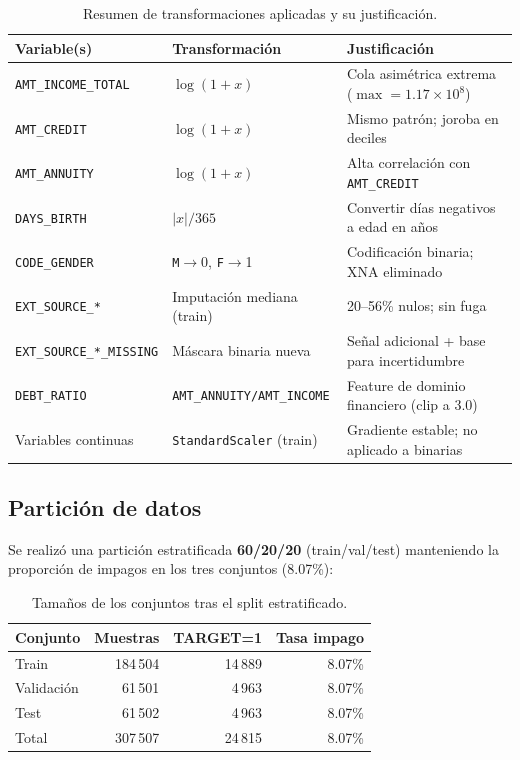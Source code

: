 \documentclass[12pt,a4paper]{article}
\begin{document}
\begin{table}[H]
\centering
\caption{Resumen de transformaciones aplicadas y su justificación.}
\label{tab:transforms}
\small
\begin{tabular}{@{}lll@{}}
\toprule
\textbf{Variable(s)} & \textbf{Transformación} & \textbf{Justificación} \\
\midrule
\texttt{AMT\_INCOME\_TOTAL} & $\log(1+x)$ & Cola asimétrica extrema ($\max = 1.17\times10^8$) \\
\texttt{AMT\_CREDIT} & $\log(1+x)$ & Mismo patrón; joroba en deciles \\
\texttt{AMT\_ANNUITY} & $\log(1+x)$ & Alta correlación con \texttt{AMT\_CREDIT} \\
\texttt{DAYS\_BIRTH} & $|x|/365$ & Convertir días negativos a edad en años \\
\texttt{CODE\_GENDER} & \texttt{M}$\to$0, \texttt{F}$\to$1 & Codificación binaria; XNA eliminado \\
\texttt{EXT\_SOURCE\_*} & Imputación mediana (train) & 20--56\% nulos; sin fuga \\
\texttt{EXT\_SOURCE\_*\_MISSING} & Máscara binaria nueva & Señal adicional + base para incertidumbre \\
\texttt{DEBT\_RATIO} & \texttt{AMT\_ANNUITY/AMT\_INCOME} & Feature de dominio financiero (clip a 3.0) \\
Variables continuas & \texttt{StandardScaler} (train) & Gradiente estable; no aplicado a binarias \\
\bottomrule
\end{tabular}
\end{table}

\subsection{Partición de datos}

Se realizó una partición estratificada \textbf{60/20/20} (train/val/test)
manteniendo la proporción de impagos en los tres conjuntos (8.07\%):

\begin{table}[H]
\centering
\caption{Tamaños de los conjuntos tras el split estratificado.}
\label{tab:splits}
\begin{tabular}{@{}lrrr@{}}
\toprule
\textbf{Conjunto} & \textbf{Muestras} & \textbf{TARGET=1} & \textbf{Tasa impago} \\
\midrule
Train      & 184\,504 & 14\,889 & 8.07\% \\
Validación &  61\,501 &  4\,963 & 8.07\% \\
Test       &  61\,502 &  4\,963 & 8.07\% \\
\midrule
Total      & 307\,507 & 24\,815 & 8.07\% \\
\bottomrule
\end{tabular}
\end{table}
\end{document}
